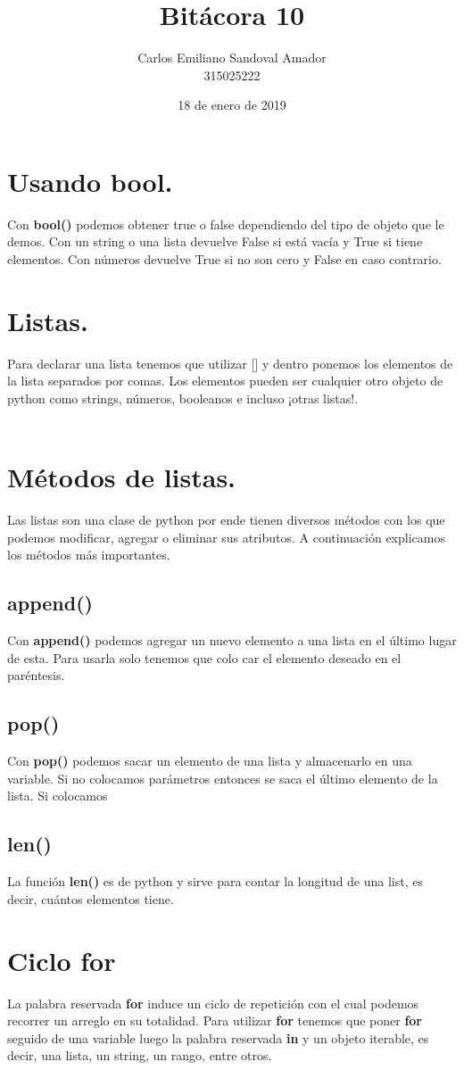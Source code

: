 \documentclass[letterpaper, 12pt, oneside]{article}%
\title{Bitácora 10}
\author{Carlos Emiliano Sandoval Amador \\ 315025222}
\date{18 de enero de 2019}
\begin{document}
	\maketitle
	\section{\large Usando bool.}
	Con \textbf{bool()} podemos obtener true o false dependiendo del tipo de objeto que le demos. Con un string o una lista devuelve False si está vacía y True si tiene elementos. Con números devuelve True si no son cero y False en caso contrario.
	\section{\large Listas.}
	Para declarar una lista tenemos que utilizar [] y dentro ponemos los elementos de la lista separados por comas. Los elementos pueden ser cualquier otro objeto de python como strings, números, booleanos e incluso ¡otras listas!. \\ \\
	\section{Métodos de listas.}
	Las listas son una clase de python por ende tienen diversos métodos con los que podemos modificar, agregar o eliminar sus atributos. A continuación explicamos los métodos más importantes.
	\subsection{append()}
	Con \textbf{append()} podemos agregar un  nuevo elemento a una lista en el último lugar de esta. Para usarla solo tenemos que colo car el elemento deseado en el paréntesis.
	\subsection{pop()}
	Con \textbf{pop()} podemos sacar un elemento de una lista y almacenarlo en una variable. Si no colocamos parámetros entonces se saca el último elemento de la lista. Si colocamos %
	\subsection{len()}
	La función \textbf{len()} es de python y sirve para contar la longitud de una list, es decir, cuántos elementos tiene.
	\section{Ciclo for}
	La palabra reservada \textbf{for} induce un ciclo de repetición con el cual podemos recorrer un arreglo en su totalidad. Para utilizar \textbf{for} tenemos que poner \textbf{for} seguido de una variable luego la palabra reservada \textbf{in} y un objeto iterable, es decir, una lista, un string, un rango, entre otros.
	
	
	
\end{document}
